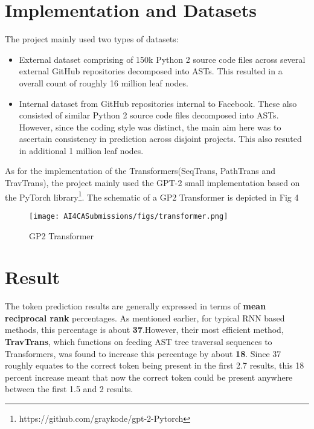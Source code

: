 \documentclass[sigplan,screen,9pt]{acmart}
\begin{document}
    \section{Implementation and Datasets}
    The project mainly used two types of datasets:\cite{FeedTree}
    \begin{itemize}
        \item External dataset comprising of 150k Python 2 source code files across several external GitHub repositories decomposed into ASTs. This resulted in a overall count of roughly 16 million leaf nodes.
        \item Internal dataset from GitHub repositories internal to Facebook. These also consisted of similar Python 2 source code files decomposed into ASTs. However, since the coding style was distinct, the main aim here was to ascertain consistency in prediction across disjoint projects. This also resuted in additional 1 million leaf nodes.
    \end{itemize}
    As for the implementation of the Transformers(SeqTrans, PathTrans and TravTrans), the project mainly used the GPT-2 small implementation\cite{radford2019language} based on the PyTorch library\footnote{https://github.com/graykode/gpt-2-Pytorch}. The schematic of a GP2 Transformer is depicted in Fig 4
    \begin{figure}[h]
        \centering
        \texttt{[image: AI4CASubmissions/figs/transformer.png]}
        \caption{GP2 Transformer}
    \end{figure}

    \section{Result}
    The token prediction results are generally expressed in terms of \textbf{mean reciprocal rank} percentages. As mentioned earlier, for typical RNN based methods, this percentage is about \textbf{37}.However, their most efficient method, \textbf{TravTrans}, which functions on feeding AST tree traversal sequences to Transformers, was found to increase this percentage by about \textbf{18}. Since 37 roughly equates to the correct token being present in the first 2.7 results, this 18 percent increase meant that now the correct token could be present anywhere between the first 1.5 and 2 results.

    
    


%
\end{document}
